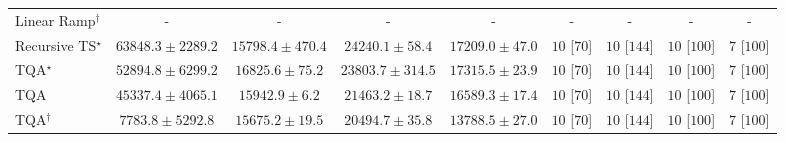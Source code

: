 \begin{tabular}{l|cccc|cccc|}
Linear Ramp$^\dagger$ & {\cellcolor[HTML]{000000}} \color[HTML]{F1F1F1} {\cellcolor{white}} \color{black} - & {\cellcolor[HTML]{000000}} \color[HTML]{F1F1F1} {\cellcolor{white}} \color{black} - & {\cellcolor[HTML]{000000}} \color[HTML]{F1F1F1} {\cellcolor{white}} \color{black} - & {\cellcolor[HTML]{000000}} \color[HTML]{F1F1F1} {\cellcolor{white}} \color{black} - & {\cellcolor[HTML]{000000}} \color[HTML]{F1F1F1} {\cellcolor{white}} \color{black} - & {\cellcolor[HTML]{000000}} \color[HTML]{F1F1F1} {\cellcolor{white}} \color{black} - & {\cellcolor[HTML]{000000}} \color[HTML]{F1F1F1} {\cellcolor{white}} \color{black} - & {\cellcolor[HTML]{000000}} \color[HTML]{F1F1F1} {\cellcolor{white}} \color{black} - \\
Recursive TS$^\star$ & {\cellcolor[HTML]{790D75}} \color[HTML]{F1F1F1} $63848.3\pm 2289.2$ & {\cellcolor[HTML]{ADC7E0}} \color[HTML]{000000} $15798.4\pm 470.4$ & {\cellcolor[HTML]{98AED3}} \color[HTML]{000000} $24240.1\pm 58.4$ & {\cellcolor[HTML]{A8C3DE}} \color[HTML]{000000} $17209.0\pm 47.0$ & {\cellcolor[HTML]{49006A}} \color[HTML]{F1F1F1} $10$ [$70$] & {\cellcolor[HTML]{49006A}} \color[HTML]{F1F1F1} $10$ [$144$] & {\cellcolor[HTML]{49006A}} \color[HTML]{F1F1F1} $10$ [$100$] & {\cellcolor[HTML]{CD238F}} \color[HTML]{F1F1F1} $7$ [$100$] \\
TQA$^\star$ & {\cellcolor[HTML]{873D9A}} \color[HTML]{F1F1F1} $52894.8\pm 6299.2$ & {\cellcolor[HTML]{A9C4DE}} \color[HTML]{000000} $16825.6\pm 75.2$ & {\cellcolor[HTML]{98B0D3}} \color[HTML]{000000} $23803.7\pm 314.5$ & {\cellcolor[HTML]{A8C3DE}} \color[HTML]{000000} $17315.5\pm 23.9$ & {\cellcolor[HTML]{49006A}} \color[HTML]{F1F1F1} $10$ [$70$] & {\cellcolor[HTML]{49006A}} \color[HTML]{F1F1F1} $10$ [$144$] & {\cellcolor[HTML]{49006A}} \color[HTML]{F1F1F1} $10$ [$100$] & {\cellcolor[HTML]{CD238F}} \color[HTML]{F1F1F1} $7$ [$100$] \\
TQA & {\cellcolor[HTML]{8B5CAA}} \color[HTML]{F1F1F1} $45337.4\pm 4065.1$ & {\cellcolor[HTML]{ACC6DF}} \color[HTML]{000000} $15942.9\pm 6.2$ & {\cellcolor[HTML]{9CB8D8}} \color[HTML]{000000} $21463.2\pm 18.7$ & {\cellcolor[HTML]{AAC4DE}} \color[HTML]{000000} $16589.3\pm 17.4$ & {\cellcolor[HTML]{49006A}} \color[HTML]{F1F1F1} $10$ [$70$] & {\cellcolor[HTML]{49006A}} \color[HTML]{F1F1F1} $10$ [$144$] & {\cellcolor[HTML]{49006A}} \color[HTML]{F1F1F1} $10$ [$100$] & {\cellcolor[HTML]{CD238F}} \color[HTML]{F1F1F1} $7$ [$100$] \\
TQA$^\dagger$ & {\cellcolor[HTML]{C6D8E9}} \color[HTML]{000000} $7783.8\pm 5292.8$ & {\cellcolor[HTML]{ADC7E0}} \color[HTML]{000000} $15675.2\pm 19.5$ & {\cellcolor[HTML]{9EBCDA}} \color[HTML]{000000} $20494.7\pm 35.8$ & {\cellcolor[HTML]{B3CBE2}} \color[HTML]{000000} $13788.5\pm 27.0$ & {\cellcolor[HTML]{49006A}} \color[HTML]{F1F1F1} $10$ [$70$] & {\cellcolor[HTML]{49006A}} \color[HTML]{F1F1F1} $10$ [$144$] & {\cellcolor[HTML]{49006A}} \color[HTML]{F1F1F1} $10$ [$100$] & {\cellcolor[HTML]{CD238F}} \color[HTML]{F1F1F1} $7$ [$100$] \\

\end{tabular}
